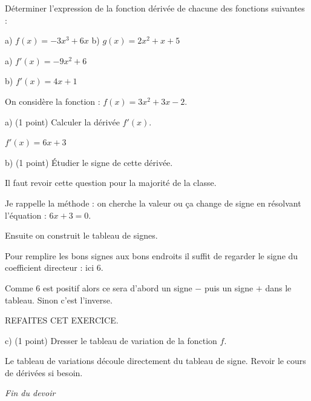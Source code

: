 \documentclass[12pt,a4paper]{exam}
\begin{document}
\begin{questions}

\question[2] Déterminer l'expression de la fonction dérivée de chacune des fonctions suivantes :

\vspace{5pt}
\hspace{1cm}a) $f(x) = -3x^3 + 6x$ \hspace{1cm}b) $g(x) = 2x^2 + x + 5$

{\color{red}a) $f'(x) = -9x^2 +6$

b) $f'(x) = 4x+1$}

\vspace{10pt}

\question On considère la fonction : $f(x) = 3x^2 + 3x - 2$.

\vspace{5pt}
\hspace{1cm}a) (1 point) Calculer la dérivée $f'(x)$.

{\color{red}$f'(x)=6x + 3$}

\vspace{5pt}
\hspace{1cm}b) (1 point) Étudier le signe de cette dérivée.

{\color{red}
Il faut revoir cette question pour la majorité de la classe.

Je rappelle la méthode : on cherche la valeur ou ça change de signe en résolvant l'équation : 
$6x + 3 = 0$.

Ensuite on construit le tableau de signes.

Pour remplire les bons signes aux bons endroits il suffit de regarder le signe du coefficient directeur : ici $6$.

Comme $6$ est positif alors ce sera d'abord un signe $-$ puis un signe $+$ dans le tableau. Sinon c'est l'inverse.

REFAITES CET EXERCICE.
}

\vspace{5pt}
\hspace{1cm}c) (1 point) Dresser le tableau de variation de la fonction $f$.

{\color{red}
Le tableau de variations découle directement du tableau de signe. Revoir le cours de dérivées si besoin.
}

\end{questions}

\vspace{0.5cm}

\begin{center}
    \textit{Fin du devoir}
\end{center}
\end{document}

